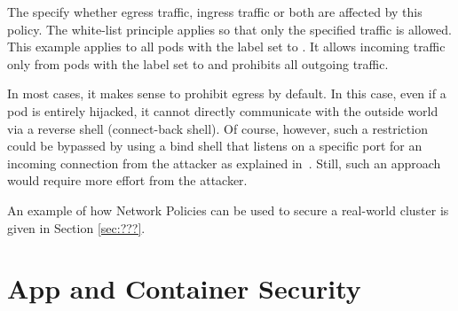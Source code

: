 The  specify whether egress traffic, ingress traffic or both are affected by this policy. The white-list principle applies so that only the specified traffic is allowed. This example applies to all pods with the label  set to . It allows incoming traffic only from pods with the label  set to  and prohibits all outgoing traffic.

In most cases, it makes sense to prohibit egress by default. In this case, even if a pod is entirely hijacked, it cannot directly communicate with the outside world via a reverse shell (connect-back shell). Of course, however, such a restriction could be bypassed by using a bind shell that listens on a specific port for an incoming connection from the attacker as explained in~\textcite{bindAndReverseShells}. Still, such an approach would require more effort from the attacker.

An example of how Network Policies can be used to secure a real-world cluster is given in Section \ref{sec:???}. %

\section{App and Container Security} \label{sec:layer4}

